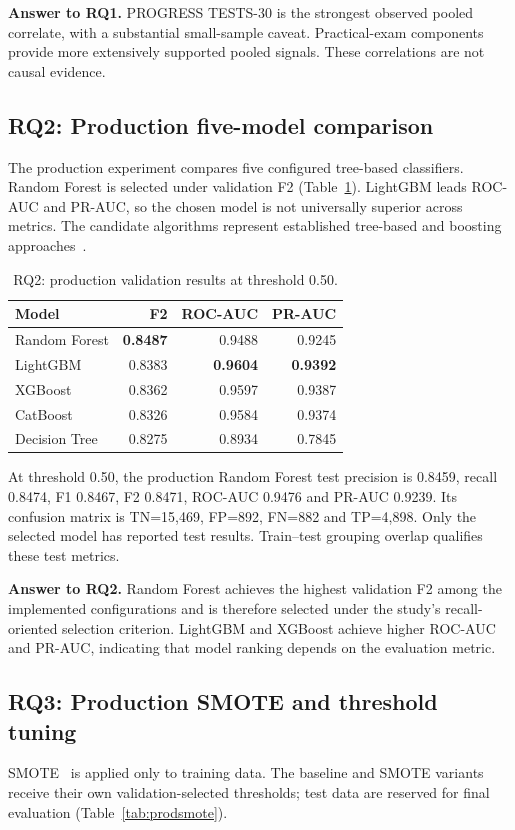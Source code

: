 \documentclass[conference]{IEEEtran}
\begin{document}
\textbf{Answer to RQ1.} PROGRESS TESTS-30 is the strongest observed pooled correlate, with a substantial small-sample caveat. Practical-exam components provide more extensively supported pooled signals. These correlations are not causal evidence.

\subsection{RQ2: Production five-model comparison}
The production experiment compares five configured tree-based classifiers. Random Forest is selected under validation F2 (Table~\ref{tab:prodmodels}). LightGBM leads ROC-AUC and PR-AUC, so the chosen model is not universally superior across metrics. The candidate algorithms represent established tree-based and boosting approaches~\cite{breiman,xgb,lgb,cat}.

\begin{table}[t]
\caption{RQ2: production validation results at threshold 0.50.}
\label{tab:prodmodels}
\centering\small
\setlength{\tabcolsep}{4pt}
\begin{tabular}{lrrr}
\toprule Model&F2&ROC-AUC&PR-AUC\\\midrule
Random Forest&\textbf{0.8487}&0.9488&0.9245\\
LightGBM&0.8383&\textbf{0.9604}&\textbf{0.9392}\\
XGBoost&0.8362&0.9597&0.9387\\
CatBoost&0.8326&0.9584&0.9374\\
Decision Tree&0.8275&0.8934&0.7845\\\bottomrule
\end{tabular}
\end{table}

At threshold 0.50, the production Random Forest test precision is 0.8459, recall 0.8474, F1 0.8467, F2 0.8471, ROC-AUC 0.9476 and PR-AUC 0.9239. Its confusion matrix is TN=15,469, FP=892, FN=882 and TP=4,898. Only the selected model has reported test results. Train--test grouping overlap qualifies these test metrics.

\textbf{Answer to RQ2.} Random Forest achieves the highest validation F2 among the implemented configurations and is therefore selected under the study's recall-oriented selection criterion. LightGBM and XGBoost achieve higher ROC-AUC and PR-AUC, indicating that model ranking depends on the evaluation metric.

\subsection{RQ3: Production SMOTE and threshold tuning}
SMOTE~\cite{smote} is applied only to training data. The baseline and SMOTE variants receive their own validation-selected thresholds; test data are reserved for final evaluation (Table~\ref{tab:prodsmote}).
\end{document}
